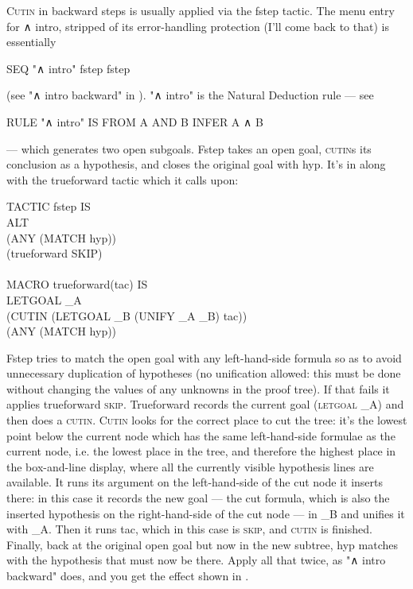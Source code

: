 \textsc{Cutin} in backward steps is usually applied via the fstep tactic. The menu entry for ∧ intro, stripped of its error-handling protection (I'll come back to that) is essentially
\begin{japeish}
SEQ "∧ intro" fstep fstep
\end{japeish}
(see "∧ intro backward" in ). "∧ intro" is the Natural Deduction rule --- see 
\begin{japeish}
RULE "∧ intro" IS FROM A AND B INFER A ∧ B
\end{japeish}
--- which generates two open subgoals. Fstep takes an open goal, \textsc{cutin}s its conclusion as a hypothesis, and closes the original goal with hyp. It's in  along with the trueforward tactic which it calls upon:
\begin{japeish}
TACTIC fstep IS \\
\tab ALT \\
\tab \tab (ANY (MATCH hyp)) \\
\tab \tab (trueforward SKIP) \\
\\
MACRO trueforward(tac) IS \\
\tab LETGOAL \_A \\
\tab \tab (CUTIN (LETGOAL \_B (UNIFY \_A \_B) tac)) \\
\tab \tab (ANY (MATCH hyp))
\end{japeish}
Fstep tries to match the open goal with any left-hand-side formula so as to avoid unnecessary duplication of hypotheses (no unification allowed: this must be done without changing the values of any unknowns in the proof tree). If that fails it applies trueforward \textsc{skip}. Trueforward records the current goal (\textsc{letgoal} \_A) and then does a \textsc{cutin}. \textsc{Cutin} looks for the correct place to cut the tree: it's the lowest point below the current node which has the same left-hand-side formulae as the current node, i.e. the lowest place in the tree, and therefore the highest place in the box-and-line display, where all the currently visible hypothesis lines are available. It runs its argument on the left-hand-side of the cut node it inserts there: in this case it records the new goal --- the cut formula, which is also the inserted hypothesis on the right-hand-side of the cut node --- in \_B and unifies it with \_A. Then it runs tac, which in this case is \textsc{skip}, and \textsc{cutin} is finished. Finally, back at the original open goal but now in the new subtree, hyp matches with the hypothesis that must now be there. Apply all that twice, as "∧ intro backward" does, and you get the effect shown in .

